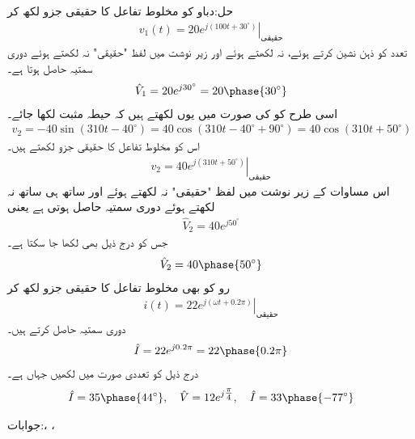 حل:دباو  کو مخلوط تفاعل کا حقیقی جزو لکھ کر
\begin{align*}
v_1(t)=\left. 20 e^{j(100 t+30^{\circ})}\right|_{\text{حقیقی}}
\end{align*}
تعدد کو ذہن نشین کرتے ہوئے،   نہ لکھتے  ہوئے اور زیر نوشت میں لفظ "حقیقی" نہ لکھتے ہوئے  دوری سمتیہ حاصل ہوتا ہے۔
\begin{align*}
\hat{V}_1=20 e^{j30^{\circ}}=20\phase{30^{\circ}}
\end{align*}
اسی طرح  کو  کی صورت میں یوں لکھتے ہیں کہ حیطہ مثبت لکھا جائے۔
\begin{align*}
v_2=-40 \sin(310t-40^{\circ})=40 \cos (310 t-40^{\circ}+90^{\circ})=40 \cos (310t+50^{\circ})
\end{align*} 
اس کو مخلوط تفاعل کا حقیقی جزو لکھتے ہیں۔
\begin{align*}
v_2=\left.40 e^{j(310t+50^{\circ})}\right|_{\text{حقیقی}}
\end{align*} 
اس مساوات کے زیر نوشت میں لفظ "حقیقی" نہ لکھتے ہوئے اور ساتھ ہی ساتھ  نہ لکھتے ہوئے دوری سمتیہ حاصل ہوتی ہے یعنی
\begin{align*}
\hat{V}_2=40 e^{ j50^{\circ}}
\end{align*} 
جس کو درج ذیل بھی لکھا جا سکتا ہے۔
\begin{align*}
\hat{V}_2=40 \phase{50^{\circ}}
\end{align*} 
رو کو بھی مخلوط تفاعل کا حقیقی جزو لکھ کر
\begin{align*}
i(t)=\left. 22 e^{j(\omega t+0.2\pi)} \right|_{\text{حقیقی}}
\end{align*}
دوری سمتیہ حاصل کرتے ہیں۔
\begin{align*}
\hat{I}=22 e^{j 0.2\pi}=22\phase{0.2 \pi}
\end{align*}
درج ذیل کو تعددی صورت میں لکھیں جہاں  ہے۔
\begin{align*}
\hat{I}=35\phase{44^{\circ}}, \quad \hat{V}=12 e^{j\tfrac{\pi}{4}}, \quad \hat{I}=33\phase{-77^{\circ}}
\end{align*}

جوابات:، ،\\

